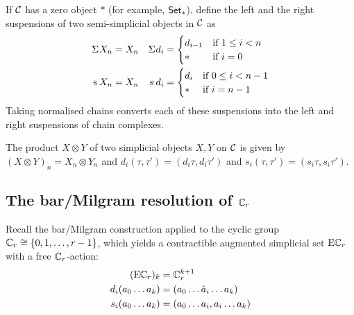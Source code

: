 If $\mathcal{C}$ has a zero object $*$ (for example, $\mathsf{Set}_*$), define the left and the right suspensions of two semi-simplicial objects in $\mathcal{C}$ as
\begin{align*}
    \Sigma^{} X_n &= X_n & \Sigma^{}d_i &= \begin{cases} d_{i-1} & \text{if $1\leq i<n$} \\
    \ast & \text{if $i=0$}
    \end{cases}
    \\
        \operatorname{s}^{} X_n &= X_n & \operatorname{s}^{}d_i &= \begin{cases} d_i & \text{if $0\leq i<n-1$} \\
    \ast & \text{if $i=n-1$}
    \end{cases}
\end{align*}
Taking normalised chains converts each of these suspensions into the left and right suspensions of chain complexes.

The product $X\otimes Y$ of two simplicial objects $X,Y$ on $\mathcal{C}$ is given by $(X\otimes Y)_n = X_n\otimes Y_n$ and $d_i(\tau,\tau') = (d_i\tau,d_i\tau')$ and $s_i(\tau,\tau') = (s_i\tau,s_i\tau')$.
\subsection{The bar/Milgram resolution of $\mathbb{C}_r$}
Recall the bar/Milgram construction applied to the cyclic group $\mathbb{C}_r\cong \{0,1,\ldots,r-1\}$, which yields a contractible augmented simplicial set $\mathrm{E}\mathbb{C}_r$ with a free $\mathbb{C}_r$-action:
\begin{align*}
	(\mathrm{E}\mathbb{C}_r)_k &= \mathbb{C}_r^{k+1}\\
	d_i(a_0\ldots a_k) &= (a_0\ldots\hat{a}_i\ldots a_k) \\
	s_i(a_0\ldots a_k) &= (a_0\ldots a_i,a_i\ldots a_k)
\end{align*}
